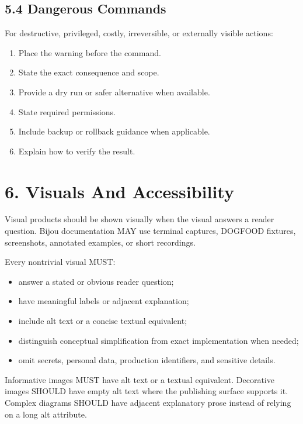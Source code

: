 \subsection{5.4 Dangerous Commands}\label{record-005-dangerous-commands}

For destructive, privileged, costly, irreversible, or externally visible actions:

\begin{enumerate}
\def\labelenumi{\arabic{enumi}.}
\tightlist
\item
  Place the warning before the command.
\item
  State the exact consequence and scope.
\item
  Provide a dry run or safer alternative when available.
\item
  State required permissions.
\item
  Include backup or rollback guidance when applicable.
\item
  Explain how to verify the result.
\end{enumerate}

\section{6. Visuals And Accessibility}\label{record-005-visuals-and-accessibility}

Visual products should be shown visually when the visual answers a reader question. Bijou documentation MAY use terminal captures, DOGFOOD fixtures, screenshots, annotated examples, or short recordings.

Every nontrivial visual MUST:

\begin{itemize}
\tightlist
\item
  answer a stated or obvious reader question;
\item
  have meaningful labels or adjacent explanation;
\item
  include alt text or a concise textual equivalent;
\item
  distinguish conceptual simplification from exact implementation when needed;
\item
  omit secrets, personal data, production identifiers, and sensitive details.
\end{itemize}

Informative images MUST have alt text or a textual equivalent. Decorative images SHOULD have empty alt text where the publishing surface supports it. Complex diagrams SHOULD have adjacent explanatory prose instead of relying on a long alt attribute.

